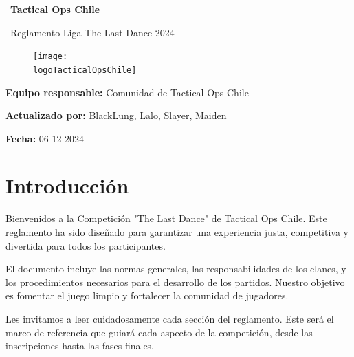 \documentclass[a4paper, 11pt]{article}
\newcommand{\logoTacticalOpsChile}{img/logo_tacticalops.png}
\newcommand{\nombreInforme}{Tactical Ops Chile}
\begin{document}
\rfoot[]{\thepage} %

    \begin{titlepage}
        \begin{center}
            {\Huge\ \textbf{\nombreInforme}}\par
            {\huge\ Reglamento Liga The Last Dance 2024}\par          
        \end{center}

        \vfill

        \begin{figure}[htb]
            \centering
            \texttt{[image: \\logoTacticalOpsChile]}
        \end{figure} 
        
        \vfill

        \textbf{Equipo responsable: } Comunidad de Tactical Ops Chile\par\vspace{0.2cm}
        \textbf{Actualizado por: } BlackLung, Lalo, Slayer, Maiden\par\vspace{0.2cm}
        \textbf{Fecha: } 06-12-2024\par\vspace{0.3cm}

    \end{titlepage}
    \clearpage

    \tableofcontents
    \clearpage

     \section{Introducción}
     Bienvenidos a la Competición "The Last Dance" de Tactical Ops Chile. Este reglamento ha sido diseñado para garantizar una experiencia justa, competitiva y divertida para todos los participantes.

    El documento incluye las normas generales, las responsabilidades de los clanes, y los procedimientos necesarios para el desarrollo de los partidos. Nuestro objetivo es fomentar el juego limpio y fortalecer la comunidad de jugadores.

    Les invitamos a leer cuidadosamente cada sección del reglamento. Este será el marco de referencia que guiará cada aspecto de la competición, desde las inscripciones hasta las fases finales.
\end{document}
